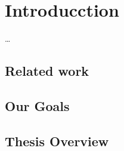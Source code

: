 \chapter{Introducction}

 \ldots


\section{Related work} \label{sec:problem}


\section{Our Goals}




\section{Thesis Overview}






